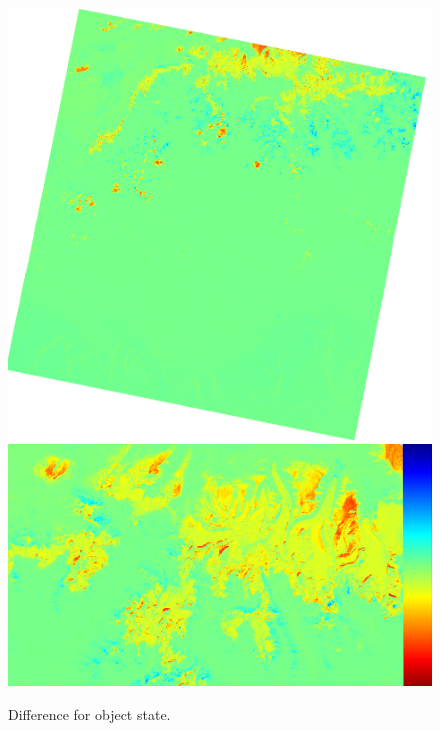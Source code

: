 \documentclass[12pt, a4paper]{report}
\begin{document}
  	\begin{figure}[H]
  		\includegraphics[width=\linewidth]{difference.png}
  		\endminipage\hfill
  		\includegraphics[width=\linewidth]{diff_tiny.png}
  		\endminipage\hfill
  		\caption{Difference for object state.}\label{fig:diff_img}
  	\end{figure}
  	
\end{document}
